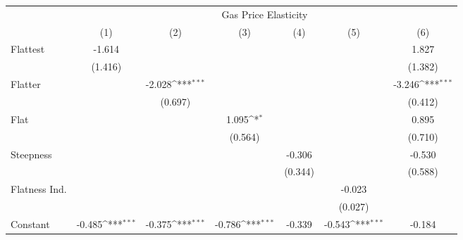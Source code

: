 {
\def\sym#1{\ifmmode^{#1}\else\(^{#1}\)\fi}
\begin{tabular}{l*{6}{c}}
\hline\hline
            &\multicolumn{6}{c}{Gas Price Elasticity}                                                                                           \\
            &\multicolumn{1}{c}{(1)}         &\multicolumn{1}{c}{(2)}         &\multicolumn{1}{c}{(3)}         &\multicolumn{1}{c}{(4)}         &\multicolumn{1}{c}{(5)}         &\multicolumn{1}{c}{(6)}         \\
\hline
Flattest    &      -1.614         &                     &                     &                     &                     &       1.827         \\
            &     (1.416)         &                     &                     &                     &                     &     (1.382)         \\
[1em]
Flatter     &                     &      -2.028\sym{***}&                     &                     &                     &      -3.246\sym{***}\\
            &                     &     (0.697)         &                     &                     &                     &     (0.412)         \\
[1em]
Flat        &                     &                     &       1.095\sym{*}  &                     &                     &       0.895         \\
            &                     &                     &     (0.564)         &                     &                     &     (0.710)         \\
[1em]
Steepness   &                     &                     &                     &      -0.306         &                     &      -0.530         \\
            &                     &                     &                     &     (0.344)         &                     &     (0.588)         \\
[1em]
Flatness Ind.&                     &                     &                     &                     &      -0.023         &                     \\
            &                     &                     &                     &                     &     (0.027)         &                     \\
[1em]
Constant    &      -0.485\sym{***}&      -0.375\sym{***}&      -0.786\sym{***}&      -0.339         &      -0.543\sym{***}&      -0.184         \\

\end{tabular}}
